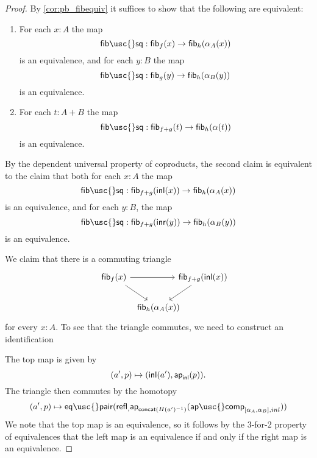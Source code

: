 \begin{proof}
By \cref{cor:pb_fibequiv} it suffices to show that the following are equivalent:
\begin{enumerate}
\item For each $x:A$ the map
\begin{equation*}
\mathsf{fib\usc{}sq}:\fib{f}{x}\to\fib{h}{\alpha_A(x)}
\end{equation*}
is an equivalence, and for each $y:B$ the map
\begin{equation*}
\mathsf{fib\usc{}sq}:\fib{g}{y}\to\fib{h}{\alpha_B(y)}
\end{equation*}
is an equivalence.
\item For each $t:A+B$ the map
\begin{equation*}
\mathsf{fib\usc{}sq}:\fib{f+g}{t} \to \fib{h}{\alpha(t)}
\end{equation*}
is an equivalence.
\end{enumerate}
By the dependent universal property of coproducts, the second claim is equivalent to the claim that both for each $x:A$ the map
\begin{equation*}
\mathsf{fib\usc{}sq}:\fib{f+g}{\inl(x)}\to \fib{h}{\alpha_A(x)}
\end{equation*}
is an equivalence, and for each $y:B$, the map
\begin{equation*}
\mathsf{fib\usc{}sq}:\fib{f+g}{\inr(y)}\to \fib{h}{\alpha_B(y)} 
\end{equation*}
is an equivalence.

We claim that there is a commuting triangle
\begin{equation*}
\begin{tikzcd}[column sep=-1em]
\fib{f}{x} \arrow[rr] \arrow[dr] & & \fib{f+g}{\inl(x)} \arrow[dl] \\
\phantom{\fib{f+g}{\inl(x)}} & \fib{h}{\alpha_A(x)}
\end{tikzcd}
\end{equation*}
for every $x:A$. To see that the triangle commutes, we need to construct an identification


The top map is given by
\begin{equation*}
(a',p)\mapsto ({\mathsf{inl}}(a'),\mathsf{ap}_{{\mathsf{inl}}}({p})).
\end{equation*}
The triangle then commutes by the homotopy
\begin{equation*}
(a',p)\mapsto \mathsf{eq\usc{}pair}(\refl,\ap{\mathsf{concat}(H(a')^{-1})}{\mathsf{ap\usc{}comp}_{[\alpha_A,\alpha_B],inl}})
\end{equation*}
We note that the top map is an equivalence, so it follows by the 3-for-2 property of equivalences that the left map is an equivalence if and only if the right map is an equivalence. 


\end{proof}
